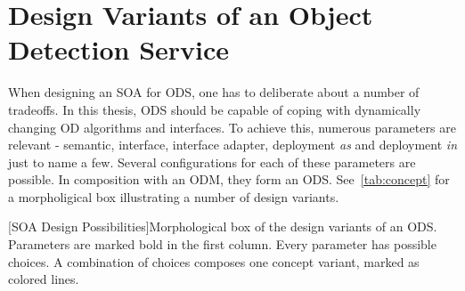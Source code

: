 \chapter{Design Variants of an Object Detection Service \label{cha:chapter3}}
\label{sec:concecptOverview}
When designing an SOA for ODS, one has to deliberate about a number of tradeoffs. In this thesis, ODS should be capable of coping with dynamically changing OD algorithms and interfaces. To achieve this, numerous parameters are relevant - semantic, interface, interface adapter, deployment \textit{as} and deployment \textit{in} just to name a few. Several configurations for each of these parameters are possible. In composition with an ODM, they form an ODS. See~\ref{tab:concept} for a morpholigical box illustrating a number of design variants.

\begin{table}[ht]
    \begin{center}
      \begin{minipage}{\textwidth}
        [SOA Design Possibilities]{Morphological box of the design variants of an ODS. Parameters are marked bold in the first column. Every parameter has possible choices. A combination of choices composes one concept variant, marked as colored lines.}\label{tab:concept} 
\end{minipage}
\end{center}
\end{table}
